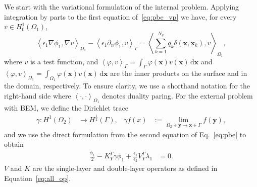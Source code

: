 We start with the variational formulation of the internal problem. Applying integration by parts to the first equation of~\eqref{eq:pbe_vp} we have, for every $v \in H_0^1(\Omega_1)$,
% 
\begin{equation}
\label{eq:fem}
 \left\langle \epsilon_1 \nabla \phi_1, \nabla v \right\rangle_{\Omega_1}  -  \left\langle  \epsilon_1\partial_n \phi_1, v \right\rangle_\Gamma =  \left\langle \sum_{k=1}^{N_q} q_k\delta(\mathbf{x},\mathbf{x}_k),  v\right\rangle_{\Omega_1},
\end{equation}
%
where $v$ is a test function, and $\left\langle\varphi,v\right\rangle_\Gamma = \int_\Gamma \varphi(\mathbf{x})v(\mathbf{x})\,\mathrm{d}\mathbf{x}$ and $\left\langle\varphi,v\right\rangle_{\Omega_1} = \int_{\Omega_1} \varphi(\mathbf{x})v(\mathbf{x})\,\mathrm{d}\mathbf{x}$ are the inner products on the surface and in the domain, respectively. To ensure clarity, we use a shorthand notation for the right-hand side where $\left\langle \cdot, \cdot \right\rangle_{\Omega_1}$ denotes duality paring.
For the external problem with BEM, we define the Dirichlet trace~\cite{MR2361676} 
\begin{align*}
\gamma:  H^1(\Omega_2) &\rightarrow H^{\frac{1}{2}}(\Gamma), & \gamma f(x) & := \lim_{\Omega_2 \ni \mathbf{y} \rightarrow \mathbf{x} \in \Gamma}  f(\mathbf{y}),
\end{align*}
and we use the direct formulation from the second equation of Eq.~\eqref{eq:pbe} to obtain
\begin{align*}
\tfrac{\phi_1}{2} - K_{Y}^{\Gamma}\gamma \phi_1 + \tfrac{\epsilon_1}{\epsilon_2}V_{Y}^{\Gamma}  \lambda_1 & = 0.
\end{align*}
$V$ and $K$ are the single-layer and double-layer operators as defined in Equation~\eqref{eq:all_op}.
%
%
%
%

